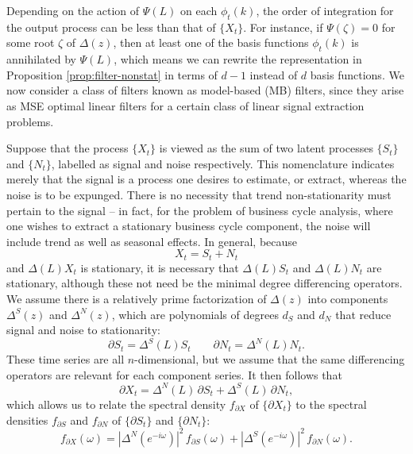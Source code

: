 \documentclass[a4paper]{book}
\begin{document}
  
Depending on the action of $\Psi (L) $ on each $\phi_t (k)$, the order of
 integration for the output process can be less than that of $\{ X_t \}$.
 For instance, if $\Psi (\zeta) = 0$ for some root $\zeta$ of $\Delta (z)$,
  then at least one of the basis functions $\phi_t (k)$ is annihilated by
   $\Psi (L)$, which means we can rewrite the representation in 
   Proposition \ref{prop:filter-nonstat} in terms of $d-1$ instead of $d$ basis
   functions.  We now consider a class of filters known as model-based (MB) filters,
  since they arise as MSE optimal linear filters for a certain class of linear
  signal extraction problems.
  
  Suppose that the process $\{ X_t \}$ is viewed as the sum of two latent processes
  $\{ S_t \}$ and $\{ N_t \}$, labelled as signal and noise respectively.
   This nomenclature indicates merely that the signal is a process one desires
  to estimate, or extract, whereas the noise is to be expunged.  There is no necessity
  that trend non-stationarity must pertain to the signal -- in fact, for the problem
  of business cycle analysis, where one wishes to extract a stationary business cycle
  component, the noise will include trend as well as seasonal effects.
  In general, because
\begin{equation}
\label{eq:signal-noise-decomp}
 X_t = S_t + N_t
\end{equation}
 and $\Delta (L) X_t$ is stationary, it is necessary that $\Delta (L) S_t$ and 
  $\Delta (L) N_t$ are stationary, although these not need be the minimal degree
  differencing operators.  We assume there is a relatively prime factorization of
  $\Delta (z)$ into components $\Delta^S (z)$ and $\Delta^N (z)$, which are polynomials
  of degrees $d_S$ and $d_N$ that reduce signal and noise to stationarity:
\[
  \partial S_t = \Delta^S (L) S_t \qquad \partial N_t = \Delta^N (L) N_t.
\]
  These time series are all $n$-dimensional, but we assume that the same differencing
  operators are relevant for each component series.  It then follows that
\begin{equation}
\label{eq:diff-x.signoise}
 \partial X_t = \Delta^N (L) \, \partial S_t + \Delta^S (L) \, \partial N_t,
\end{equation}
 which allows us to relate the spectral density $f_{\partial X}$ of $\{ \partial X_t \}$
 to the spectral densities $f_{\partial S}$
  and $f_{\partial N}$ of $\{ \partial S_t \}$ and $\{ \partial N_t \}$:
 \begin{equation}
 \label{eq:sig-and-noise.sdf}
 f_{\partial X} (\omega) = {| \Delta^N (e^{-i \omega}) |}^2 \, f_{\partial S} (\omega)
  + {| \Delta^S (e^{-i \omega}) |}^2 \, f_{\partial N} (\omega).
 \end{equation}
\end{document}
